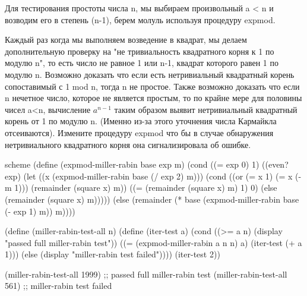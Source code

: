 Для тестирования простоты числа n, мы выбираем произвольный a < n и возводим его в степень (n-1), берем молуль используя процедуру expmod.

Каждый раз когда мы выполняем возведение в квадрат, мы делаем дополнительную проверку на "не тривиальность квадратного корня к 1 по модулю n", то есть число не равное 1 или n-1, квадрат которого равен 1 по модулю n. Возможно доказать что если есть нетривиальный квадратный корень сопоставимый с 1 mod n, тогда n не простое. Также возможно доказать что если n нечетное число, которое не является простым, то по крайне мере для половины чисел a<n, вычисление $a^{n-1}$ таким образом выявит нетривиальный квадратный корень от 1 по модулю n. (Именно из-за этого уточнения числа Кармайкла отсеиваются).
Измените процедуру expmod что бы в случае обнаружения нетривиального квадратного корня она сигнализировала об ошибке.

\begin{codelisting}{scheme}
(define (expmod-miller-rabin base exp m)
  (cond ((= exp 0) 1)
        ((even? exp)
         (let ((x (expmod-miller-rabin base (/ exp 2) m)))
           (cond ((or (= x 1) (= x (- m 1))) (remainder (square x) m))
                 ((= (remainder (square x) m) 1) 0)
                 (else (remainder (square x) m)))))
        (else (remainder (* base (expmod-miller-rabin base (- exp 1) m))
                         m))))

(define (miller-rabin-test-all n)
  (define (iter-test a)
    (cond ((>= a n) (display "passed full miller-rabin test"))
          ((= (expmod-miller-rabin a n n) a) (iter-test (+ a 1)))
          (else (display "miller-rabin test failed"))))
  (iter-test 2))

(miller-rabin-test-all 1999) ;;  passed full miller-rabin test
(miller-rabin-test-all 561) ;;  miller-rabin test failed
\end{codelisting}